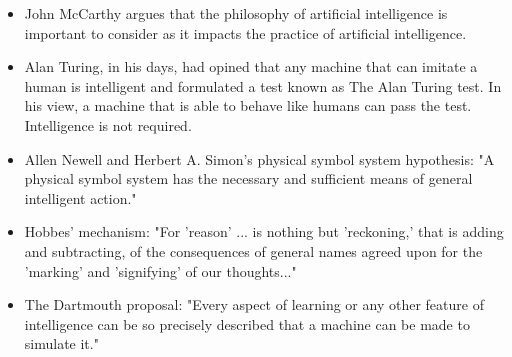 \documentclass[13pt]{article}
\begin{document}
\begin{itemize}
\item John McCarthy argues that the philosophy of artificial intelligence is important to consider as it impacts the practice of artificial intelligence.
\item Alan Turing, in his days, had opined that any machine that can imitate a human is intelligent and formulated a test known as The Alan Turing test. In his view, a machine that is able to behave like humans can pass the test. Intelligence is not required.
\item Allen Newell and Herbert A. Simon's physical symbol system hypothesis: "A physical symbol system has the necessary and sufficient means of general intelligent action."
\item Hobbes' mechanism: "For 'reason' ... is nothing but 'reckoning,' that is adding and subtracting, of the consequences of general names agreed upon for the 'marking' and 'signifying' of our thoughts..."
\item The Dartmouth proposal: "Every aspect of learning or any other feature of intelligence can be so precisely described that a machine can be made to simulate it."

\end{itemize}
\end{document}
